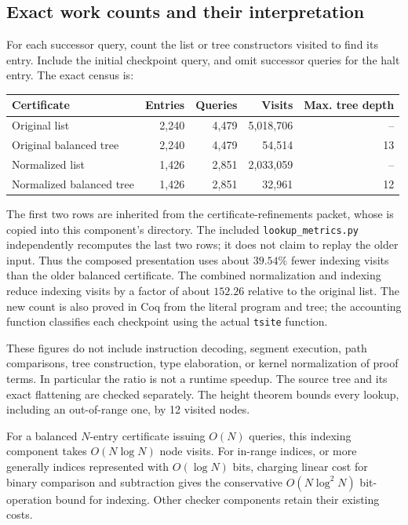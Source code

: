 \documentclass[11pt,letterpaper]{article}
\newcommand{\code}[1]{\texttt{#1}}
\begin{document}
\subsection{Exact work counts and their interpretation}
For each successor query, count the list or tree constructors visited to find its entry. Include the initial checkpoint query, and omit successor queries for the halt entry. The exact census is:
\begin{center}
\begin{tabular}{lrrrr}
\toprule
Certificate & Entries & Queries & Visits & Max. tree depth\\
\midrule
Original list & 2,240 & 4,479 & 5,018,706 & --\\
Original balanced tree & 2,240 & 4,479 & 54,514 & 13\\
Normalized list & 1,426 & 2,851 & 2,033,059 & --\\
Normalized balanced tree & 1,426 & 2,851 & 32,961 & 12\\
\bottomrule
\end{tabular}
\end{center}
The first two rows are inherited from the certificate-refinements packet,
whose  is copied into
this component's  directory.
The included \code{lookup\_metrics.py} independently recomputes the last two
rows; it does not claim to replay the older input.
Thus the composed presentation uses about $39.54\%$ fewer indexing visits than the older balanced certificate. The combined normalization and indexing reduce indexing visits by a factor of about $152.26$ relative to the original list. The new count is also proved in Coq from the literal program and tree; the accounting function classifies each checkpoint using the actual \code{tsite} function.

These figures do not include instruction decoding, segment execution, path comparisons, tree construction, type elaboration, or kernel normalization of proof terms. In particular the ratio is not a runtime speedup. The source tree and its exact flattening are checked separately. The height theorem bounds every lookup, including an out-of-range one, by 12 visited nodes.

For a balanced $N$-entry certificate issuing $O(N)$ queries, this indexing component takes $O(N\log N)$ node visits. For in-range indices, or more generally indices represented with $O(\log N)$ bits, charging linear cost for binary comparison and subtraction gives the conservative $O(N\log^2N)$ bit-operation bound for indexing. Other checker components retain their existing costs.
\end{document}
